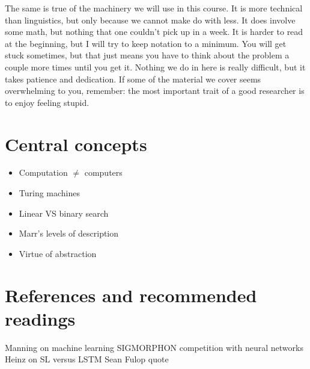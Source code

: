 The same is true of the machinery we will use in this course.
It is more technical than linguistics, but only because we cannot make do with less.
It does involve some math, but nothing that one couldn't pick up in a week.
It is harder to read at the beginning, but I will try to keep notation to a minimum.
You will get stuck sometimes, but that just means you have to think about the problem a couple more times until you get it.
Nothing we do in here is really difficult, but it takes patience and dedication.
If some of the material we cover seems overwhelming to you, remember: the most important trait of a good researcher is to enjoy feeling stupid.

\section*{Central concepts}

\begin{itemize}
    \item Computation $\neq$ computers
    \item Turing machines
    \item Linear VS binary search
    \item Marr's levels of description
    \item Virtue of abstraction
\end{itemize}

\section*{References and recommended readings}

Manning on machine learning
SIGMORPHON competition with neural networks
Heinz on SL versus LSTM
Sean Fulop quote
